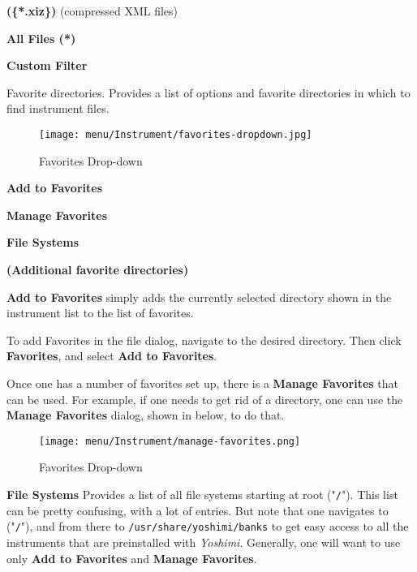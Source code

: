    \begin{enumber}
      \item \textbf{(\{*.xiz\})} (compressed XML files)
      \item \textbf{All Files (*)}
      \item \textbf{Custom Filter}
   \end{enumber}

   Favorite directories.
   Provides a list of options and favorite directories in which to find 
   instrument files.

\begin{figure}[H]
   \centering 
   \texttt{[image: menu/Instrument/favorites-dropdown.jpg]}
   \caption{Favorites Drop-down}
   \label{fig:open_instrument_favorites}
\end{figure}

   \begin{enumber}
      \item \textbf{Add to Favorites}
      \item \textbf{Manage Favorites}
      \item \textbf{File Systems}
      \item \textbf{(Additional favorite directories)}
   \end{enumber}

   \textbf{Add to Favorites}
   simply adds the currently selected directory shown in the instrument list
   to the list of favorites.

   To add Favorites in the file dialog, navigate to the desired directory.
   Then click \textbf{Favorites}, and select \textbf{Add to Favorites}.

   Once one has a number of favorites set up,
   there is a \textbf{Manage Favorites} that can be used.
   For example, if one needs to get rid of a directory, one can use the
   \textbf{Manage Favorites}
   dialog, shown in
    below,
   to do that.

\begin{figure}[H]
   \centering 
   \texttt{[image: menu/Instrument/manage-favorites.png]}
   \caption{Favorites Drop-down}
   \label{fig:manage_instrument_favorites}
\end{figure}

   \textbf{File Systems} 
   Provides a list of all file systems starting at root ("\texttt{/}").
   This list can be pretty confusing, with a lot of entries.
   But note that one navigates to ("\texttt{/}"), and from there to
   \texttt{/usr/share/yoshimi/banks} to get easy access to all the
   instruments that are preinstalled with
   \textsl{Yoshimi}.
   Generally, one will want to use only
   \textbf{Add to Favorites} and \textbf{Manage Favorites}.

